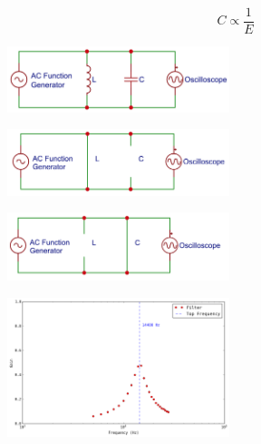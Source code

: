 \documentclass[journal]{IEEEtran}
\begin{document}
\begin{equation}
C \propto \frac{1}{E}
\label{eq:cap}
\end{equation}


\begingroup
    \centering
    \includegraphics[width=245]{images/lab5_6.png}
    \label{fig:HPF}
\endgroup

\begingroup
    \centering
    \includegraphics[width=245]{images/lab5_8.png}
    \label{fig:HPF}
\endgroup

\begingroup
    \centering
    \includegraphics[width=245]{images/lab5_9.png}
    \label{fig:HPF}
\endgroup

\begingroup
    \centering
    \includegraphics[width=245]{images/lab5_7.png}
    \label{fig:HPF}
\endgroup
\end{document}
